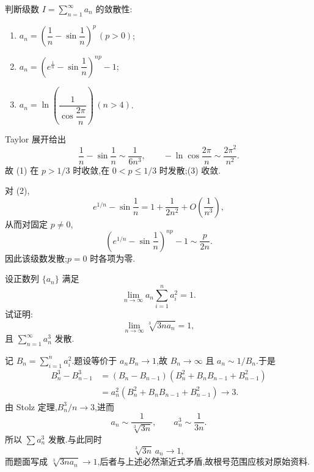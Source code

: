 \begin{example}
    判断级数 $\displaystyle I=\sum\limits_{n=1}^{\infty}a_n$ 的敛散性:
    \begin{enumerate}
        \item $\displaystyle a_n=\left(\dfrac{1}{n}-\sin\dfrac{1}{n}\right)^p\,(p>0)$;
        \item $\displaystyle a_n=\left(e^{\frac{1}{n}}-\sin\dfrac{1}{n}\right)^{np}-1$;
        \item $\displaystyle a_n=\ln\left(\dfrac{1}{\cos\dfrac{2\pi}{n}}\right)\,(n>4)$.
    \end{enumerate}
\end{example}
\exampleblank

\begin{solution}
    Taylor 展开给出
    \[
        \dfrac{1}{n}-\sin\dfrac{1}{n}\sim\dfrac{1}{6n^3},
        \qquad
        -\ln\cos\dfrac{2\pi}{n}\sim\dfrac{2\pi^2}{n^2}.
    \]
    故 (1) 在 $p>1/3$ 时收敛,在 $0<p\leq1/3$ 时发散;(3) 收敛.

    对 (2),
    \[
        e^{1/n}-\sin\dfrac{1}{n}=1+\dfrac{1}{2n^2}+O\left(\dfrac{1}{n^3}\right),
    \]
    从而对固定 $p\neq0$,
    \[
        \left(e^{1/n}-\sin\dfrac{1}{n}\right)^{np}-1
        \sim\dfrac{p}{2n}.
    \]
    因此该级数发散;$p=0$ 时各项为零.
\end{solution}

\begin{example}
    设正数列 $\{a_n\}$ 满足
    \[
        \displaystyle\lim\limits_{n\to\infty}a_n\sum\limits_{i=1}^na_i^2=1.
    \]
    试证明:
    \[
        \displaystyle\lim\limits_{n\to\infty}\sqrt[3]{3na_n}=1,
    \]
    且 $\displaystyle\sum\limits_{n=1}^{\infty}a_n^3$ 发散.
\end{example}
\exampleblank

\begin{solution}
    记 $\displaystyle B_n=\sum_{i=1}^{n}a_i^2$.题设等价于 $a_nB_n\to1$,故
    $B_n\to\infty$ 且 $a_n\sim1/B_n$.于是
    \[
        \begin{aligned}
            B_n^3-B_{n-1}^3
             & =(B_n-B_{n-1})(B_n^2+B_nB_{n-1}+B_{n-1}^2)          \\
             & =a_n^2(B_n^2+B_nB_{n-1}+B_{n-1}^2)\longrightarrow3.
        \end{aligned}
    \]
    由 Stolz 定理,$B_n^3/n\to3$,进而
    \[
        a_n\sim\dfrac{1}{\sqrt[3]{3n}},
        \qquad a_n^3\sim\dfrac{1}{3n}.
    \]
    所以 $\displaystyle \sum a_n^3$ 发散.与此同时
    \[
        \sqrt[3]{3n}\,a_n\longrightarrow1,
    \]
    而题面写成 $\sqrt[3]{3na_n}\to1$,后者与上述必然渐近式矛盾,故根号范围应核对原始资料.
\end{solution}



